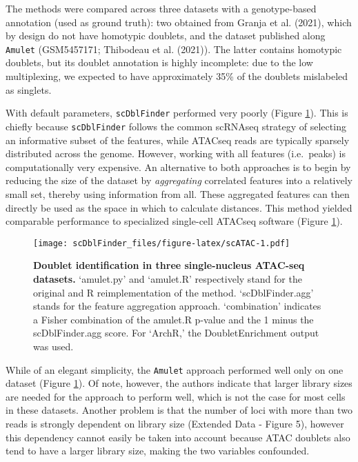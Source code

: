 \documentclass[10pt,a4paper,twocolumn]{article}
\begin{document}
The methods were compared across three datasets with a genotype-based annotation (used as ground truth): two obtained from Granja et al. (2021), which by design do not have homotypic doublets, and the dataset published along \texttt{Amulet} (GSM5457171; Thibodeau et al. (2021)). The latter contains homotypic doublets, but its doublet annotation is highly incomplete: due to the low multiplexing, we expected to have approximately 35\% of the doublets mislabeled as singlets.

With default parameters, \texttt{scDblFinder} performed very poorly (Figure \ref{fig:scATAC}).
This is chiefly because \texttt{scDblFinder} follows the common scRNAseq strategy of selecting an informative subset of the features, while ATACseq reads are typically sparsely distributed across the genome.
However, working with all features (i.e.~peaks) is computationally very expensive.
An alternative to both approaches is to begin by reducing the size of the dataset by \emph{aggregating} correlated features into a relatively small set, thereby using information from all.
These aggregated features can then directly be used as the space in which to calculate distances.
This method yielded comparable performance to specialized single-cell ATACseq software (Figure \ref{fig:scATAC}).

\begin{figure}
\centering
\texttt{[image: scDblFinder\_files/figure-latex/scATAC-1.pdf]}
\caption{\label{fig:scATAC}\textbf{Doublet identification in three single-nucleus ATAC-seq datasets.} `amulet.py' and `amulet.R' respectively stand for the original and R reimplementation of the method. `scDblFinder.agg' stands for the feature aggregation approach. `combination' indicates a Fisher combination of the amulet.R p-value and the 1 minus the scDblFinder.agg score. For `ArchR,' the DoubletEnrichment output was used.}
\end{figure}

While of an elegant simplicity, the \texttt{Amulet} approach performed well only on one dataset (Figure \ref{fig:scATAC}). Of note, however, the authors indicate that larger library sizes are needed for the approach to perform well, which is not the case for most cells in these datasets. Another problem is that the number of loci with more than two reads is strongly dependent on library size (Extended Data - Figure 5), however this dependency cannot easily be taken into account because ATAC doublets also tend to have a larger library size, making the two variables confounded.
\end{document}
